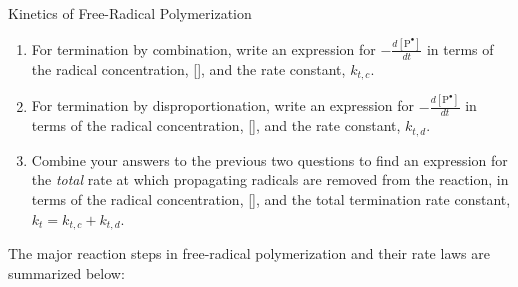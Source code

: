 \begin{activity}{Kinetics of Free-Radical Polymerization}
\begin{ctqs}
		\begin{enumerate}
			\item For termination by combination, write an expression for $-\frac{d[\text{P}^{\bullet}]}{dt}$ in terms of the radical concentration, [], and the rate constant, $k_{t,c}$.
			
				\begin{solution}[0.75in]
				\end{solution}
			
			\item For termination by disproportionation, write an expression for $-\frac{d[\text{P}^{\bullet}]}{dt}$ in terms of the radical concentration, [], and the rate constant, $k_{t,d}$.
			
				\begin{solution}[0.75in]
				\end{solution}
			
			\item Combine your answers to the previous two questions to find an expression for the \emph{total} rate at which propagating radicals are removed from the reaction, in terms of the radical concentration, [], and the total termination rate constant, $k_t = k_{t,c} + k_{t,d}$.
			
				\begin{solution}[0.75in]
				\end{solution}
				
		\end{enumerate}

\end{ctqs}



\begin{model}
\label{\labelbase:mdl:kineticssummary}

	The major reaction steps in free-radical polymerization and their rate laws are summarized below:
	

\end{model}
\end{activity}
